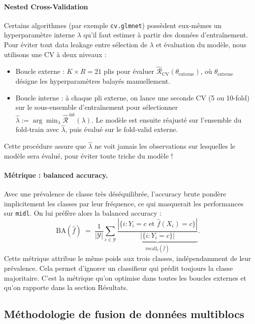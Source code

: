 \documentclass[a4paper,11pt]{paper}
\theoremstyle{plain}
\theoremstyle{definition}
\theoremstyle{remark}
\begin{document}
\paragraph{Nested Cross-Validation}
Certains algorithmes (par exemple \texttt{cv.glmnet}) possèdent eux-mêmes un hyperparamètre interne $\lambda$ qu'il faut estimer à partir des données d'entraînement. Pour éviter tout data leakage entre sélection de $\lambda$ et évaluation du modèle, nous utilisons une CV à deux niveaux :
\begin{itemize}
    \item Boucle externe : $K \times R = 21$ plis pour évaluer $\widehat{\mathcal{R}}_{\mathrm{CV}}(\theta_{\text{externe}})$, où
          $\theta_{\text{externe}}$ désigne les hyperparamètres balayés manuellement.
    \item Boucle interne : à chaque pli externe, on lance une seconde CV (5 ou 10-fold) sur le sous-ensemble d'entraînement pour sélectionner $\hat\lambda := \arg\min_\lambda
              \widehat{\mathcal{R}}^{\,\text{int}}(\lambda)$. Le modèle est ensuite  réajusté sur l'ensemble du fold-train avec $\hat\lambda$, puis évalué sur le fold-valid externe.
\end{itemize}

Cette procédure assure que $\hat\lambda$ ne voit jamais les observations sur lesquelles le modèle sera évalué, pour éviter toute triche du modèle !

\paragraph{Métrique : balanced accuracy.}
Avec une prévalence de classe très déséquilibrée, l'accuracy brute pondère implicitement les classes par leur fréquence, ce qui masquerait les performances sur \texttt{midl}. On lui préfère alors la balanced accuracy :
\[
    \mathrm{BA}(\hat f) \;=\; \frac{1}{|\mathcal{Y}|}\sum_{c \in \mathcal{Y}}
    \underbrace{\frac{|\{i : Y_i = c \text{ et } \hat f(X_i) = c\}|}
        {|\{i : Y_i = c\}|}}_{\text{recall}_c(\hat f)}.
\]
Cette métrique attribue le même poids aux trois classes, indépendamment de leur prévalence. Cela permet d'ignorer un classifieur qui prédit toujours la classe majoritaire. C'est la métrique qu'on optimise dans toutes les boucles externes et qu'on rapporte dans la section Résultats.


\subsection{Méthodologie de fusion de données multiblocs}
\end{document}

